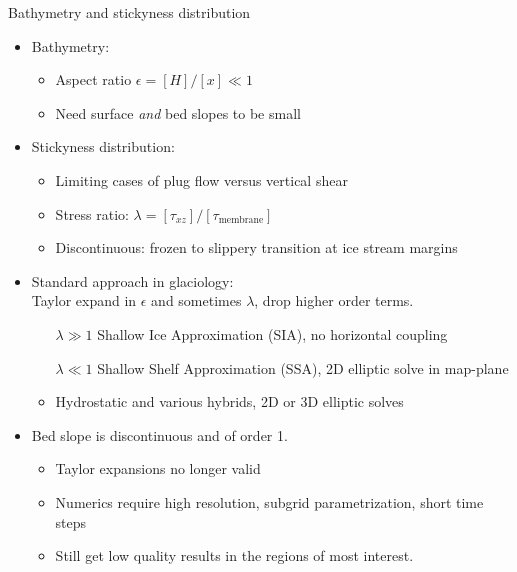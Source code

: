 \begin{frame}{Bathymetry and stickyness distribution}
  \begin{itemize}
  \item Bathymetry:
    \begin{itemize}
    \item Aspect ratio $\epsilon = [H]/[x] \ll 1$
    \item Need surface \emph{and} bed slopes to be small
    \end{itemize}
  \item Stickyness distribution:
    \begin{itemize}
    \item Limiting cases of plug flow versus vertical shear
    \item Stress ratio: $\lambda = [\tau_{xz}]/[\tau_{\text{membrane}}]$
    \item Discontinuous: frozen to slippery transition at ice stream margins
    \end{itemize}
  \item Standard approach in glaciology: \\
    Taylor expand in $\epsilon$ and sometimes $\lambda$, drop higher order terms.
    \begin{itemize}
    \item[$\lambda \gg 1$] Shallow Ice Approximation (SIA), no horizontal coupling
    \item[$\lambda \ll 1$] Shallow Shelf Approximation (SSA), 2D elliptic solve in map-plane
    \item Hydrostatic and various hybrids, 2D or 3D elliptic solves
    \end{itemize}
  \item<2> \alert{\large Bed slope is discontinuous and of order 1.}
    \begin{itemize}
    \item Taylor expansions no longer valid
    \item Numerics require high resolution, subgrid parametrization, short time steps
    \item Still get low quality results in the regions of most interest.
    \end{itemize}
  \end{itemize}
\end{frame}
